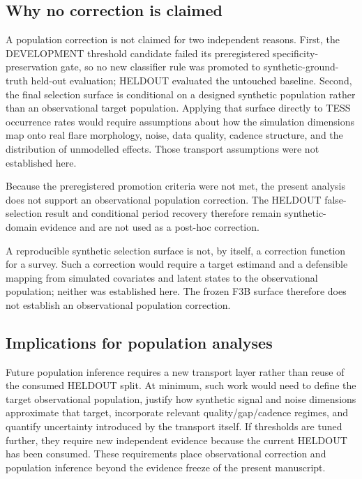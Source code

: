 \documentclass[11pt,a4paper]{article}
\begin{document}
\subsection{Why no correction is claimed}
A population correction is not claimed for two independent reasons. First, the DEVELOPMENT threshold candidate failed its preregistered specificity-preservation gate, so no new classifier rule was promoted to synthetic-ground-truth held-out evaluation; HELDOUT evaluated the untouched baseline. Second, the final selection surface is conditional on a designed synthetic population rather than an observational target population. Applying that surface directly to TESS occurrence rates would require assumptions about how the simulation dimensions map onto real flare morphology, noise, data quality, cadence structure, and the distribution of unmodelled effects. Those transport assumptions were not established here.

Because the preregistered promotion criteria were not met, the present analysis does not support an observational population correction. The HELDOUT false-selection result and conditional period recovery therefore remain synthetic-domain evidence and are not used as a post-hoc correction.




A reproducible synthetic selection surface is not, by itself, a correction function for a survey. Such a correction would require a target estimand and a defensible mapping from simulated covariates and latent states to the observational population; neither was established here. The frozen F3B surface therefore does not establish an observational population correction.

\subsection{Implications for population analyses}
Future population inference requires a new transport layer rather than reuse of the consumed HELDOUT split. At minimum, such work would need to define the target observational population, justify how synthetic signal and noise dimensions approximate that target, incorporate relevant quality/gap/cadence regimes, and quantify uncertainty introduced by the transport itself. If thresholds are tuned further, they require new independent evidence because the current HELDOUT has been consumed. These requirements place observational correction and population inference beyond the evidence freeze of the present manuscript.
\end{document}
